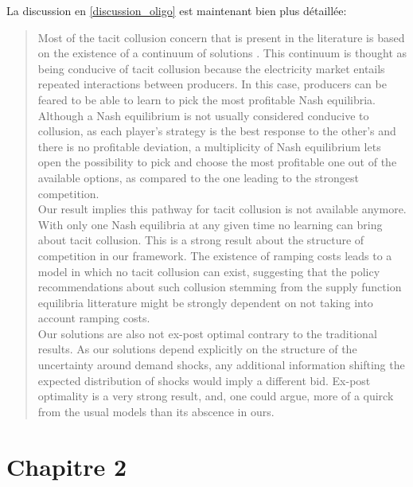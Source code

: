 \documentclass{article}
\begin{document}
\begin{itemize}
La discussion en \ref{discussion_oligo} est maintenant bien plus détaillée:\\

\begin{quote}
Most of the tacit collusion concern that is present in the literature is based on the existence of a continuum of solutions \cite{bolle1992supply}. This continuum is thought as being conducive of tacit collusion because the electricity market entails repeated interactions between producers. In this case, producers can be feared to be able to learn to pick the most profitable Nash equilibria. Although a Nash equilibrium is not usually considered conducive to collusion, as each player's strategy is the best response to the other's and there is no profitable deviation, a multiplicity of Nash equilibrium lets open the possibility to pick and choose the most profitable one out of the available options, as compared to the one leading to the strongest competition.\\

Our result implies this pathway for tacit collusion is not available anymore. With only one Nash equilibria at any given time no learning can bring about tacit collusion. This is a strong result about the structure of competition in our framework. The existence of ramping costs leads to a model in which no tacit collusion can exist, suggesting that the policy recommendations about such collusion stemming from the supply function equilibria litterature might be strongly dependent on not taking into account ramping costs.\\

Our solutions are also not ex-post optimal contrary to the traditional results. As our solutions depend explicitly on the structure of the uncertainty around demand shocks, any additional information shifting the expected distribution of shocks would imply a different bid. Ex-post optimality is a very strong result, and, one could argue, more of a quirck from the usual models than its abscence in ours.
\end{quote}


\end{itemize}

\section{Chapitre 2}
\end{document}
